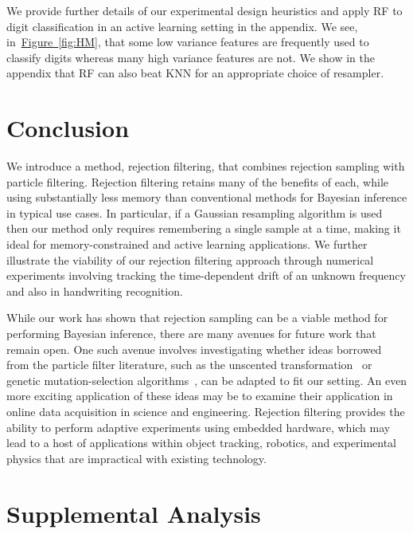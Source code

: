 \documentclass{article} %
\newcommand{\fig}[1]{\hyperref[fig:#1]{Figure~\ref*{fig:#1}}}
\begin{document}
We provide further details of our experimental design heuristics and apply RF to digit classification in an active learning setting in the appendix.  We see,  in~\fig{HM}, that some low variance features are frequently used to classify digits whereas many high variance features are not.  We show in the appendix that RF can also beat KNN  for an appropriate choice of resampler.

\section{Conclusion}
\label{sec:conclusions}

We introduce a method, rejection filtering, that combines
rejection sampling with particle filtering. Rejection filtering retains many of the benefits
of each, while using substantially less memory than conventional methods for Bayesian inference in typical use cases.
In particular, if a Gaussian resampling algorithm is used then our method only requires remembering a single sample at a time, making it ideal
for memory-constrained and active learning applications.
We further illustrate the viability of our rejection filtering approach through numerical experiments
involving tracking the time-dependent drift of an unknown frequency and also in handwriting recognition.

While our work has shown that rejection sampling can be a viable method for performing Bayesian inference, there are many
avenues for future work that remain open.  One such avenue involves investigating whether ideas borrowed from the particle
filter literature, such as the unscented transformation~\cite{van2000unscented} or genetic mutation-selection algorithms~\cite{del2012adaptive,del2000branching}, can be adapted to fit our setting.  An even more exciting
application of these ideas may be to examine their application in online data acquisition in science and engineering.  Rejection
filtering provides the ability to perform adaptive experiments using embedded hardware, which may lead to a host of applications
within object tracking, robotics, and experimental physics that are impractical with existing technology.


\appendix

\section{Supplemental Analysis}
\end{document}
